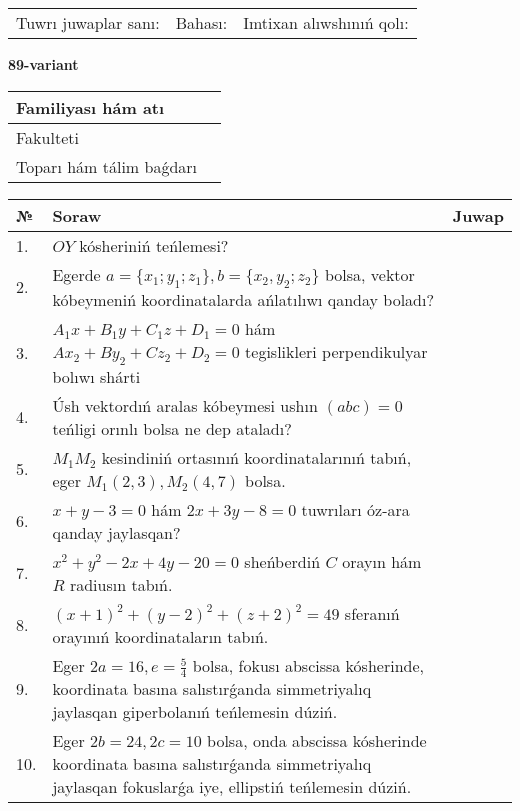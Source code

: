 \documentclass{article}
\begin{document}
\vspace{1cm}

\begin{tabular}{lll}
Tuwrı juwaplar sanı: \underline{\hspace{1.5cm}} & 
Bahası: \underline{\hspace{1.5cm}} & 
Imtixan alıwshınıń qolı: \underline{\hspace{2cm}} \\
\end{tabular}

\egroup

\newpage


\textbf{89-variant}\\

\bgroup
\def\arraystretch{1.6} %

\begin{tabular}{|m{5.7cm}|m{9.5cm}|}
\hline
Familiyası hám atı & \\
\hline
Fakulteti  & \\
\hline
Toparı hám tálim baǵdarı  & \\
\hline
\end{tabular}

\vspace{1cm}

\begin{tabular}{|m{0.7cm}|m{10cm}|m{4cm}|}
\hline
№ & Soraw & Juwap \\
\hline
1. & $OY$ kósheriniń teńlemesi? &  \\
\hline
2. & Egerde $a=\{ x_1; y_1; z_1\}, b=\{ x_2, y_2; z_2\}$ bolsa, vektor kóbeymeniń koordinatalarda ańlatılıwı qanday boladı? &  \\
\hline
3. & $A_1x+B_1y+C_1z+D_1=0$ hám $Ax_2+By_2+Cz_2+D_2=0$ tegislikleri perpendikulyar bolıwı shárti &  \\
\hline
4. & Úsh vektordıń aralas kóbeymesi ushın $(abc)=0$ teńligi orınlı bolsa ne dep ataladı? &  \\
\hline
5. & $M_{1}M_{2}$ kesindiniń ortasınıń koordinatalarınıń tabıń, eger $M_{1} (2, 3), M_{2} (4, 7)$ bolsa. &  \\
\hline
6. & $x+y-3=0$ hám $2x+3y-8=0$ tuwrıları óz-ara qanday jaylasqan? &  \\
\hline
7. & $x^{2}+y^{2}-2x+4y-20=0$ sheńberdiń $C$ orayın hám $R$ radiusın tabıń. &  \\
\hline
8. & $(x+1)^{2}+(y-2) ^{2}+(z+2) ^{2}=49$ sferanıń orayınıń koordinataların tabıń. &  \\
\hline
9. & Eger $2a=16, e=\frac{5}{4}$ bolsa, fokusı abscissa kósherinde, koordinata basına salıstırǵanda simmetriyalıq jaylasqan giperbolanıń teńlemesin dúziń. &  \\
\hline
10. & Eger $2b=24, 2 c=10$ bolsa, onda abscissa kósherinde koordinata basına salıstırǵanda simmetriyalıq jaylasqan fokuslarǵa iye, ellipstiń teńlemesin dúziń. &  \\
\hline
\end{tabular}
\end{document}
